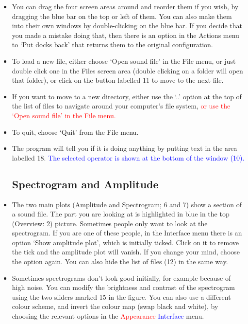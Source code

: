 \documentclass{article}
\begin{document}
\begin{itemize}
\item You can drag the four screen areas around and reorder them if you wish, by dragging the blue bar on the top or left of them. You can also make them into their own windows by double-clicking on the blue bar. If you decide that you made a mistake doing that, then there is an option in the Actions menu to `Put docks back' that returns them to the original configuration.

\item To load a new file, either choose `Open sound file' in the File menu, or just double click one in the Files screen area (double clicking on a folder will open that folder), or click on the button labelled 11 to move to the next file. 

\item If you want to move to a new directory, either use the `..' option at the top of the list of files to navigate around your computer's file system, \textcolor{red}{or use the  `Open sound file' in the File menu.} 

\item To quit, choose `Quit' from the File menu. 

\item The program will tell you if it is doing anything by putting text in the area labelled 18. \textcolor{blue}{The selected operator is shown at the bottom of the window (10).}

\subsection{Spectrogram and Amplitude}

\item The two main plots (Amplitude and Spectrogram; 6 and 7) show a section of a sound file. The part you are looking at is highlighted in blue in the top (Overview: 2) picture. Sometimes people only want to look at the spectrogram. If you are one of these people, in the Interface menu there is an option `Show amplitude plot', which is initially ticked. Click on it to remove the tick and the amplitude plot will vanish. If you change your mind, choose the option again. You can also hide the list of files (12) in the same way. 

\item Sometimes spectrograms don't look good initially, for example because of high noise. You can modify the brightness and contrast of the spectrogram using the two sliders marked 15 in the figure. You can also use a different colour scheme, and invert the colour map (swap black and white), by choosing the relevant options in the \textcolor{red}{Appearance }\textcolor{blue}{Interface} menu. 


\end{itemize}
\end{document}

